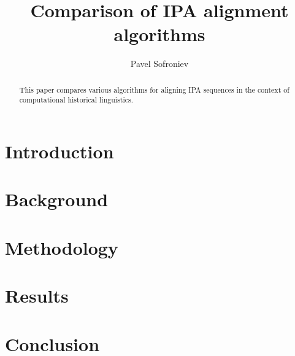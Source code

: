\documentclass{article}
\begin{document}
\title{Comparison of IPA alignment algorithms}
\author{Pavel Sofroniev}
\maketitle

\begin{abstract}
	This paper compares various algorithms for aligning IPA sequences in the context of computational historical linguistics.
\end{abstract}

\section{Introduction}

\section{Background}

\section{Methodology}

\section{Results}

\section{Conclusion}
\end{document}
